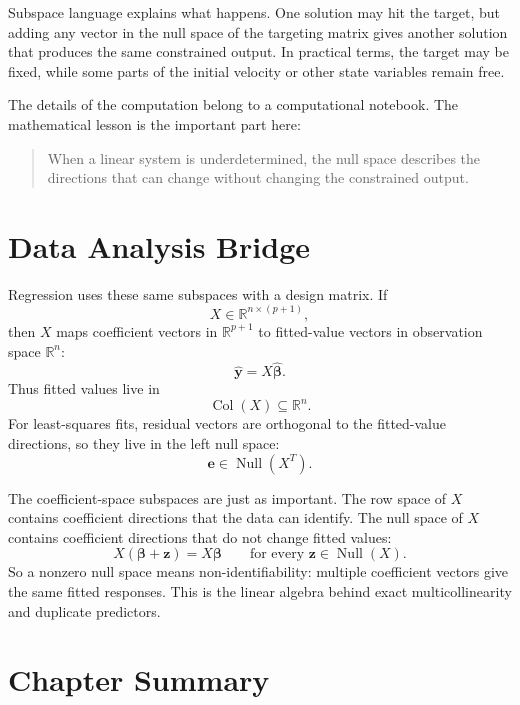 Subspace language explains what happens. One solution may hit the target, but adding any vector in the null space of the targeting matrix gives another solution that produces the same constrained output. In practical terms, the target may be fixed, while some parts of the initial velocity or other state variables remain free.

The details of the computation belong to a computational notebook. The mathematical lesson is the important part here:

\begin{quote}
When a linear system is underdetermined, the null space describes the directions that can change without changing the constrained output.
\end{quote}

\section{Data Analysis Bridge}
\label{mf:ch11-data-analysis-bridge}

Regression uses these same subspaces with a design matrix. If
\[
    X\in\mathbb{R}^{n\times(p+1)},
\]
then \(X\) maps coefficient vectors in \(\mathbb{R}^{p+1}\) to fitted-value vectors in observation space \(\mathbb{R}^n\):
\[
    \widehat{\mathbf{y}}=X\widehat{\boldsymbol\beta}.
\]
Thus fitted values live in
\[
    \operatorname{Col}(X)\subseteq\mathbb{R}^n.
\]
For least-squares fits, residual vectors are orthogonal to the fitted-value directions, so they live in the left null space:
\[
    \mathbf{e}\in\operatorname{Null}(X^T).
\]

The coefficient-space subspaces are just as important. The row space of \(X\) contains coefficient directions that the data can identify. The null space of \(X\) contains coefficient directions that do not change fitted values:
\[
    X(\boldsymbol\beta+\mathbf{z})=X\boldsymbol\beta
    \qquad\text{for every }\mathbf{z}\in\operatorname{Null}(X).
\]
So a nonzero null space means non-identifiability: multiple coefficient vectors give the same fitted responses. This is the linear algebra behind exact multicollinearity and duplicate predictors.

\section{Chapter Summary}
\label{mf:subspaces-summary}

